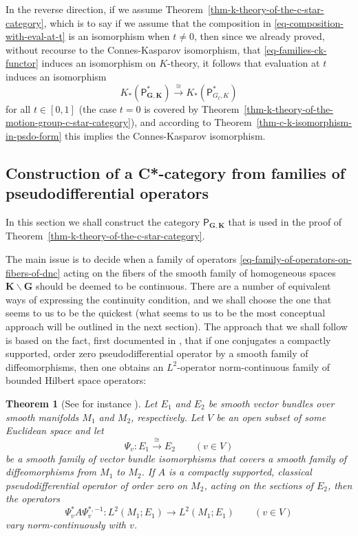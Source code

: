 \documentclass[leqno,11pt]{amsart}
\numberwithin{equation}{subsection}
\theoremstyle{plain}
\newtheorem{theorem}[equation]{Theorem}
\theoremstyle{definition}
\theoremstyle{remark}
\newcommand{\GG}{\pmb{G}}
\newcommand{\KK}{\pmb{K}}
\newcommand{\PSDO}{\mathsf{P}}
\begin{document}
In the reverse direction, if we assume Theorem~\ref{thm-k-theory-of-the-c-star-category}, which is to say if we assume that the composition in \eqref{eq-composition-with-eval-at-t} is an isomorphism when $t \neq 0$, then since we already proved, without recourse to the Connes-Kasparov isomorphism, that \eqref{eq-families-ck-functor} induces an isomorphism on $K$-theory, it follows that evaluation at $t$ induces an isomorphism
\[
 K_*(\PSDO^*_{\GG,\KK} ) \stackrel \cong \longrightarrow  K_* (\PSDO^*_{G_t,K} ) 
\]
for all $t\in [0,1]$ (the case $t = 0$ is covered by Theorem~\ref{thm-k-theory-of-the-motion-group-c-star-category}), and according to Theorem~\ref{thm-c-k-isomorphism-in-psdo-form} this implies the Connes-Kasparov isomorphism.
 
 

\subsection{Construction of a C*-category from families of pseudodifferential operators}
\label{subsec-construction-of-technical-c-star-category}

In this section we shall construct the category $\PSDO_{\GG,\KK}$ that is used in the proof of Theorem~\ref{thm-k-theory-of-the-c-star-category}. 

The main issue is to decide when a family of operators \eqref{eq-family-of-operators-on-fibers-of-dnc} acting on the fibers of the smooth family of homogeneous spaces  $\pmb K \backslash \pmb G$ should be deemed to be continuous.  There are a number of equivalent ways of expressing the continuity condition, and  we shall choose the one that seems to us to be the quickest (what seems to us to be the most conceptual approach will be outlined in the next section).  The approach that we shall follow is based on the fact, first documented in \cite{AtiyahSingerFour}, that if one conjugates a compactly supported, order zero pseudodifferential operator  by a smooth family of diffeomorphisms, then one obtains an $L^2$-operator norm-continuous family of bounded Hilbert space operators: 

\begin{theorem}[See for instance {\cite[Prop.~1.3]{AtiyahSingerFour}}]
\label{thm-norm-continuity-of-psdos-under-conjgation-by-families-of-diffeos}
Let $E_1$ and $E_2$  be  smooth vector bundles over  smooth manifolds $M_1$ and $M_2$, respectively. Let $V$ be an open subset of some Euclidean space and let 
\[
\Psi_v \colon E_1 \stackrel \cong \longrightarrow E_2\qquad (v\in V)
\]
be a smooth family of vector bundle isomorphisms  that covers  a smooth family of diffeomorphisms from $M_1$ to $M_2$.  If $A$ is a compactly supported, classical pseudodifferential operator of order zero on $M_2$, acting on the sections of $E_2$, then the operators 
\[
\Psi_v  ^* A \Psi_v^{*,-1} \colon L^2 (M_1; E_1) \longrightarrow L^2 (M_1; E_1) \qquad (v \in V)
\]
vary norm-continuously with $v$.
\end{theorem}
\end{document}
